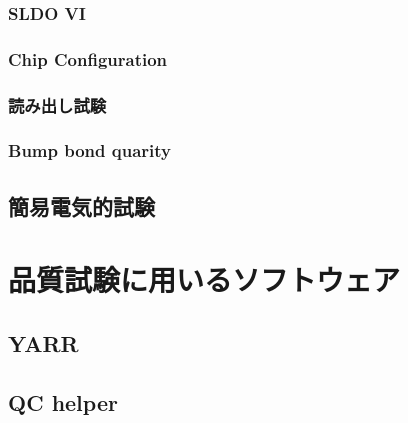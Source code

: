 \subsubsection{SLDO VI}

\subsubsection{Chip Configuration}

\subsubsection{読み出し試験}

\subsubsection{Bump bond quarity}

\subsection{簡易電気的試験}



\section{品質試験に用いるソフトウェア}
\subsection{YARR}
\subsection{QC helper}



